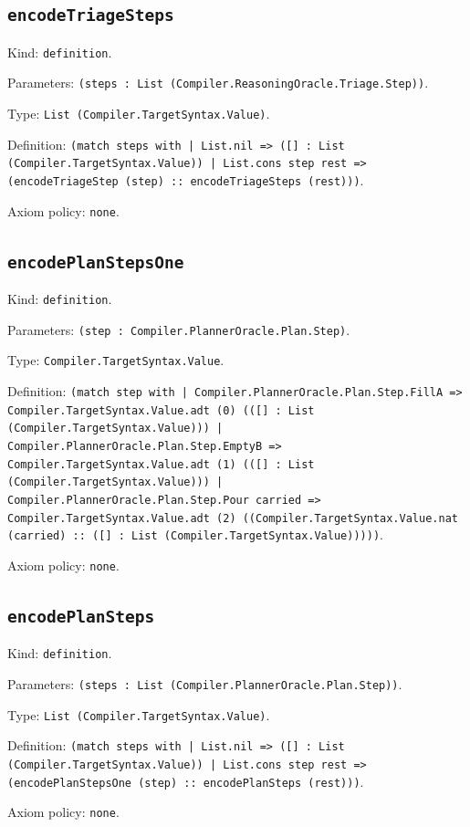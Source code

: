 \documentclass[11pt]{article}
\begin{document}
\subsection*{\texttt{encodeTriageSteps}}
\noindent Kind: \texttt{definition}.\par
\noindent Parameters: \texttt{(steps : List (Compiler.ReasoningOracle.Triage.Step))}.\par
\noindent Type: \texttt{List (Compiler.TargetSyntax.Value)}.\par
\noindent Definition: \texttt{(match steps with | List.nil => ([] : List (Compiler.TargetSyntax.Value)) | List.cons step rest => (encodeTriageStep (step) :: encodeTriageSteps (rest)))}.\par
\noindent Axiom policy: \texttt{none}.\par
\subsection*{\texttt{encodePlanStepsOne}}
\noindent Kind: \texttt{definition}.\par
\noindent Parameters: \texttt{(step : Compiler.PlannerOracle.Plan.Step)}.\par
\noindent Type: \texttt{Compiler.TargetSyntax.Value}.\par
\noindent Definition: \texttt{(match step with | Compiler.PlannerOracle.Plan.Step.FillA => Compiler.TargetSyntax.Value.adt (0) (([] : List (Compiler.TargetSyntax.Value))) | Compiler.PlannerOracle.Plan.Step.EmptyB => Compiler.TargetSyntax.Value.adt (1) (([] : List (Compiler.TargetSyntax.Value))) | Compiler.PlannerOracle.Plan.Step.Pour carried => Compiler.TargetSyntax.Value.adt (2) ((Compiler.TargetSyntax.Value.nat (carried) :: ([] : List (Compiler.TargetSyntax.Value)))))}.\par
\noindent Axiom policy: \texttt{none}.\par
\subsection*{\texttt{encodePlanSteps}}
\noindent Kind: \texttt{definition}.\par
\noindent Parameters: \texttt{(steps : List (Compiler.PlannerOracle.Plan.Step))}.\par
\noindent Type: \texttt{List (Compiler.TargetSyntax.Value)}.\par
\noindent Definition: \texttt{(match steps with | List.nil => ([] : List (Compiler.TargetSyntax.Value)) | List.cons step rest => (encodePlanStepsOne (step) :: encodePlanSteps (rest)))}.\par
\noindent Axiom policy: \texttt{none}.\par
\end{document}
